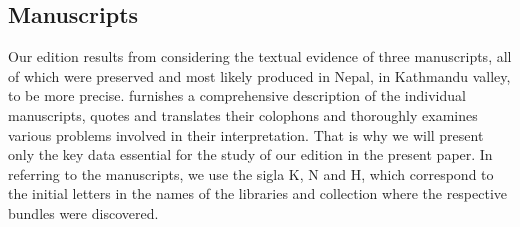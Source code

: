 
\subsection{Manuscripts}
Our edition results from considering the textual evidence of three manuscripts, all of which were preserved and most likely produced in Nepal, in Kathmandu valley, to be more precise. \textcites[\S 
2.1]{kleb-2021b} furnishes a comprehensive description of the individual manuscripts, quotes and translates their colophons and thoroughly examines various problems involved in their interpretation. That is why we will present only the key data essential for the study of our edition in the present paper.
In referring to the manuscripts, we use the sigla K, N and H, which correspond to the initial letters in the names of the libraries and collection where the respective bundles were discovered.

